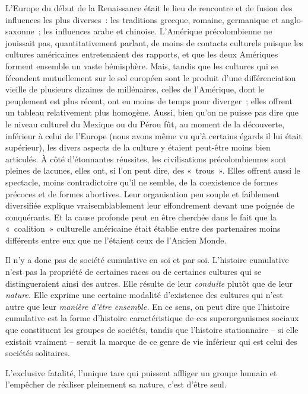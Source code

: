 \documentclass[french,twoside]{book} %
\begin{document}
L’Europe du début de la Renaissance était le lieu de rencontre et de fusion des influences les plus diverses : les traditions grecque, romaine, germanique et anglo-saxonne ; les influences arabe et chinoise. L’Amérique précolombienne ne jouissait pas, quantitativement parlant, de moins de contacts culturels puisque les cultures américaines entretenaient des rapports, et que les deux Amériques forment ensemble un vaste hémisphère. Mais, tandis que les cultures qui se fécondent mutuellement sur le sol européen sont le produit d’une différenciation vieille de plusieurs dizaines de millénaires, celles de l’Amérique, dont le peuplement est plus récent, ont eu moins de temps pour diverger ; elles offrent un tableau relativement plus homogène. Aussi, bien qu’on ne puisse pas dire que le niveau culturel du Mexique ou du Pérou fût, au moment de la découverte, inférieur à celui de l’Europe (nous avons même vu qu’à certains égards il lui était supérieur), les divers aspects de la culture y étaient peut-être moins bien articulés. À côté d’étonnantes réussites, les civilisations précolombiennes sont pleines de lacunes, elles ont, si l’on peut dire, des « trous ». Elles offrent aussi le spectacle, moins contradictoire qu’il ne semble, de la coexistence de formes précoces et de formes abortives. Leur organisation peu souple et faiblement diversifiée explique vraisemblablement leur effondrement devant une poignée de conquérants. Et la cause profonde peut en être cherchée dans le fait que la « coalition » culturelle américaine était établie entre des partenaires moins différents entre eux que ne l’étaient ceux de l’Ancien Monde.\par
Il n’y a donc pas de société cumulative en soi et par soi. L’histoire cumulative n’est pas la propriété de certaines races ou de certaines cultures qui se distingueraient ainsi des autres. Elle résulte de leur \emph{conduite} plutôt que de leur \emph{nature.} Elle exprime une certaine modalité d’existence des cultures qui n’est autre que leur \emph{manière d’être ensemble.} En ce sens, on peut dire que l’histoire cumulative est la forme d’histoire caractéristique de ces superorganismes sociaux que constituent les groupes de sociétés, tandis que l’histoire stationnaire – si elle existait vraiment – serait la marque de ce genre de vie inférieur qui est celui des sociétés solitaires.\par
L’exclusive fatalité, l’unique tare qui puissent affliger un groupe humain et l’empêcher de réaliser pleinement sa nature, c’est d’être seul.\par
\end{document}
